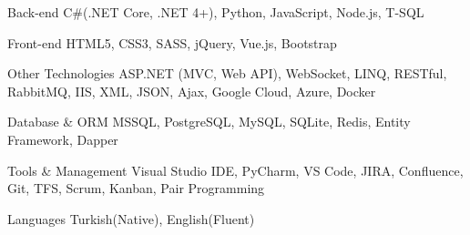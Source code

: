 

\begin{cvskills}

  \cvskill
    {Back-end} %
    {C\#(.NET Core, .NET 4+), Python, JavaScript, Node.js, T-SQL} %

  \cvskill
    {Front-end} %
    {HTML5, CSS3, SASS, jQuery, Vue.js, Bootstrap} %

  \cvskill
    {Other Technologies} %
    {ASP.NET (MVC, Web API), WebSocket, LINQ, RESTful, RabbitMQ, IIS, XML, JSON, Ajax, Google Cloud, Azure, Docker} %

  \cvskill
    {Database \& ORM} %
    {MSSQL, PostgreSQL, MySQL, SQLite, Redis, Entity Framework, Dapper} %

  \cvskill
    {Tools \& Management} %
    {Visual Studio IDE, PyCharm, VS Code, JIRA, Confluence, Git, TFS, Scrum, Kanban, Pair Programming} %

  \cvskill
    {Languages} %
    {Turkish(Native), English(Fluent)} %

\end{cvskills}